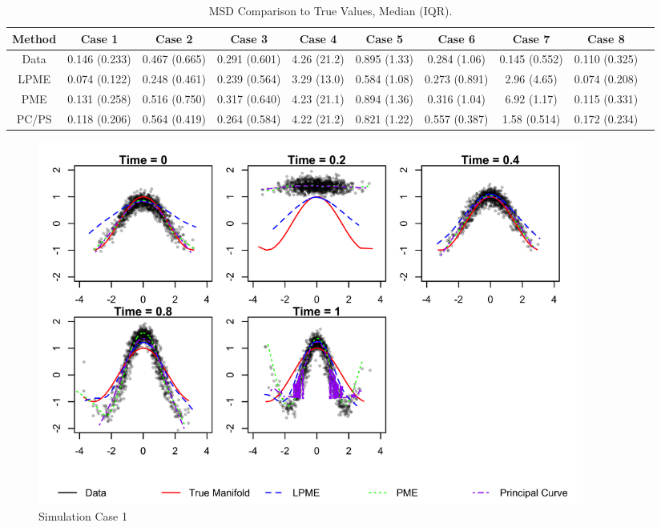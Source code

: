 \documentclass[11pt,reqno]{article}
\renewcommand{\textwidth}{180mm}
\theoremstyle{definition}
\begin{document}
\begin{table}[h]
\footnotesize
  \centering
  \begin{tabular}{|c c c c c c c c c c|}
    \hline
    Method & Case 1 & Case 2 & Case 3 & Case 4 & Case 5 & Case 6 & Case 7 & Case 8 \\
    \hline
    Data & 0.146 (0.233) & 0.467 (0.665) & 0.291 (0.601) & 4.26 (21.2) & 0.895 (1.33) & 0.284 (1.06) & 0.145 (0.552) & 0.110 (0.325) \\
    LPME & 0.074 (0.122) & 0.248 (0.461) & 0.239 (0.564) & 3.29 (13.0) & 0.584 (1.08) & 0.273 (0.891) & 2.96 (4.65) & 0.074 (0.208) \\
    PME & 0.131 (0.258) & 0.516 (0.750) & 0.317 (0.640) & 4.23 (21.1) & 0.894 (1.36) & 0.316 (1.04) & 6.92 (1.17) & 0.115 (0.331) \\
    PC/PS & 0.118 (0.206) & 0.564 (0.419) & 0.264 (0.584) & 4.22 (21.2) & 0.821 (1.22) & 0.557 (0.387) & 1.58 (0.514) & 0.172 (0.234) \\
    \hline
  \end{tabular}
  \caption{MSD Comparison to True Values, Median (IQR).}
  \label{table:simulation_results_median}
\end{table}

\begin{figure}[h]
  \centering
  \includegraphics[width=\textwidth]{sim_case1}
  \caption{Simulation Case 1}
  \label{fig:sim_case1}
\end{figure}
\end{document}
